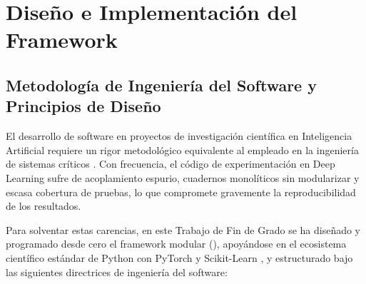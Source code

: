 
\chapter{Diseño e Implementación del Framework }
\label{cap:arquitectura_framework}

\section{Metodología de Ingeniería del Software y Principios de Diseño}
\label{sec:soft_principios}

El desarrollo de software en proyectos de investigación científica en Inteligencia Artificial requiere un rigor metodológico equivalente al empleado en la ingeniería de sistemas críticos \cite{sommerville2011software, guillen2025libro}. Con frecuencia, el código de experimentación en Deep Learning sufre de acoplamiento espurio, cuadernos monolíticos sin modularizar y escasa cobertura de pruebas, lo que compromete gravemente la reproducibilidad de los resultados.

Para solventar estas carencias, en este Trabajo de Fin de Grado se ha diseñado y programado desde cero el framework modular  (), apoyándose en el ecosistema científico estándar de Python con PyTorch \cite{paszke2019pytorch} y Scikit-Learn \cite{pedregosa2011scikit}, y estructurado bajo las siguientes directrices de ingeniería del software:

